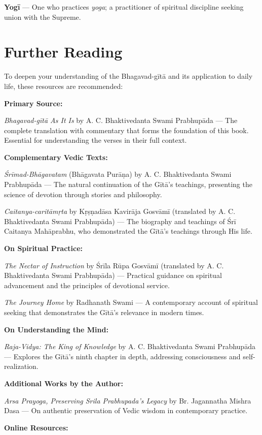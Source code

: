 \documentclass[11pt,twoside]{book}
\begin{document}
\textbf{Yogī} — One who practices \emph{yoga}; a practitioner of spiritual discipline seeking union with the Supreme.

\chapter*{Further Reading}

To deepen your understanding of the Bhagavad-gītā and its application to daily life, these resources are recommended:

\textbf{Primary Source:}

\emph{Bhagavad-gītā As It Is} by A. C. Bhaktivedanta Swami Prabhupāda — The complete translation with commentary that forms the foundation of this book. Essential for understanding the verses in their full context.

\textbf{Complementary Vedic Texts:}

\emph{Śrīmad-Bhāgavatam} (Bhāgavata Purāṇa) by A. C. Bhaktivedanta Swami Prabhupāda — The natural continuation of the Gītā's teachings, presenting the science of devotion through stories and philosophy.

\emph{Caitanya-caritāmṛta} by Kṛṣṇadāsa Kavirāja Gosvāmī (translated by A. C. Bhaktivedanta Swami Prabhupāda) — The biography and teachings of Śrī Caitanya Mahāprabhu, who demonstrated the Gītā's teachings through His life.

\textbf{On Spiritual Practice:}

\emph{The Nectar of Instruction} by Śrīla Rūpa Gosvāmī (translated by A. C. Bhaktivedanta Swami Prabhupāda) — Practical guidance on spiritual advancement and the principles of devotional service.

\emph{The Journey Home} by Radhanath Swami — A contemporary account of spiritual seeking that demonstrates the Gītā's relevance in modern times.

\textbf{On Understanding the Mind:}

\emph{Raja-Vidya: The King of Knowledge} by A. C. Bhaktivedanta Swami Prabhupāda — Explores the Gītā's ninth chapter in depth, addressing consciousness and self-realization.

\textbf{Additional Works by the Author:}

\emph{Arsa Prayoga, Preserving Srila Prabhupada's Legacy} by Br. Jagannatha Mishra Dasa — On authentic preservation of Vedic wisdom in contemporary practice.

\textbf{Online Resources:}
\end{document}
